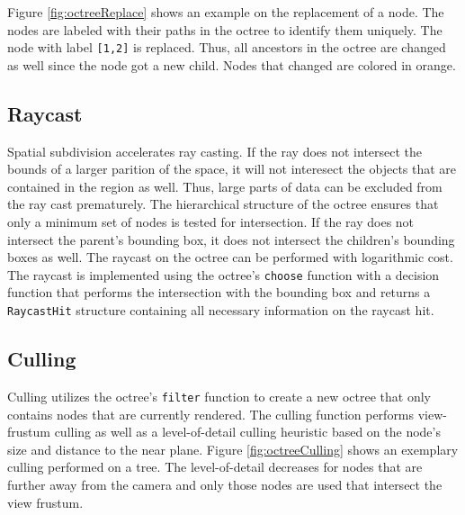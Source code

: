Figure \ref{fig:octreeReplace} shows an example on the replacement of a node. The nodes are labeled with their paths in the octree to identify them uniquely. The node with label \verb|[1,2]| is replaced. Thus, all ancestors in the octree are changed as well since the node got a new child. Nodes that changed are colored in orange. 


\subsection{Raycast}
Spatial subdivision accelerates ray casting. If the ray does not intersect the bounds of a larger parition of the space, it will not interesect the objects that are contained in the region as well. Thus, large parts of data can be excluded from the ray cast prematurely. The hierarchical structure of the octree ensures that only a minimum set of nodes is tested for intersection. If the ray does not intersect the parent's bounding box, it does not intersect the children's bounding boxes as well. The raycast on the octree can be performed with logarithmic cost. The raycast is implemented using the octree's \verb|choose| function with a decision function that performs the intersection with the bounding box and returns a \verb|RaycastHit| structure containing all necessary information on the raycast hit. 


\subsection{Culling}

Culling utilizes the octree's \verb|filter| function to create a new octree that only contains nodes that are currently rendered. The culling function performs view-frustum culling as well as a level-of-detail culling heuristic based on the node's size and distance to the near plane. Figure \ref{fig:octreeCulling} shows an exemplary culling performed on a tree. The level-of-detail decreases for nodes that are further away from the camera and only those nodes are used that intersect the view frustum.

